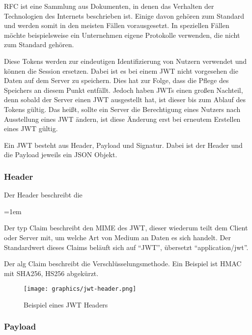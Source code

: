 \gls{RFC} ist eine Sammlung aus Dokumenten, in denen das Verhalten der Technologien des Internets beschrieben ist. Einige davon gehören zum Standard und werden somit in den meisten Fällen vorausgesetzt. In speziellen Fällen möchte beispielsweise ein Unternehmen eigene Protokolle verwenden, die nicht zum Standard gehören.

Diese Tokens werden zur eindeutigen Identifizierung von Nutzern verwendet und können die Session ersetzen. Dabei ist es bei einem \gls{JWT} nicht vorgesehen die Daten auf dem Server zu speichern. Dies hat zur Folge, dass die Pflege des Speichers an diesem Punkt entfällt. Jedoch haben \gls{JWT}s einen gro{\ss}en Nachteil, denn sobald der Server einen \gls{JWT} ausgestellt hat, ist dieser bis zum Ablauf des Tokens gültig. Das hei{\ss}t, sollte ein Server die Berechtigung eines Nutzers nach Ausstellung eines \gls{JWT} ändern, ist diese Änderung erst bei erneutem Erstellen eines \gls{JWT} gültig.

Ein \gls{JWT} besteht aus Header, Payload und Signatur. Dabei ist der Header und die Payload jeweils ein \gls{JSON} Objekt.

\subsubsection{Header}
\label{sec: jwt_header}
Der Header beschreibt die 

\begin{description}
	\leftskip=1em
	\item[typ] Der typ Claim beschreibt den \gls{MIME} des \gls{JWT}, dieser wiederum teilt dem Client oder Server mit, um welche Art von Medium an Daten es sich handelt. Der Standardwert dieses Claims beläuft sich auf \enquote{JWT}, übersetzt \enquote{application/jwt}.
	\item[alg] Der alg Claim beschreibt die Verschlüsselungsmethode. Ein Beispiel ist \gls{HMAC} mit \gls{SHA256}, HS256 abgekürzt.
\end{description}

\begin{figure}[h]
	\centering
	\texttt{[image: graphics/jwt-header.png]}
	\caption{Beispiel eines \gls{JWT} Headers }
	\label{fig:jwt-header}
\end{figure}

\subsubsection{Payload}
\label{sec: jwt-payload}


